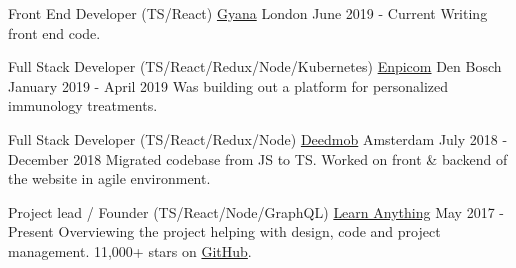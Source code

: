 
\begin{cventries}

  \cventry
    {Front End Developer (TS/React)}
    {\href{https://www.gyana.co.uk}{Gyana}}
    {London}
    {June 2019 - Current}
    {
      {Writing front end code.}
    }

  \cventry
    {Full Stack Developer (TS/React/Redux/Node/Kubernetes)}
    {\href{https://www.enpicom.com}{Enpicom}}
    {Den Bosch}
    {January 2019 - April 2019}
    {
      {Was building out a platform for personalized immunology treatments.}
    }

  \cventry
    {Full Stack Developer (TS/React/Redux/Node)}
    {\href{https://www.deedmob.com}{Deedmob}}
    {Amsterdam}
    {July 2018 - December 2018}
    {
      {Migrated codebase from JS to TS. Worked on front \& backend of the website in agile environment.}
    }

  \cventry
    {Project lead / Founder (TS/React/Node/GraphQL)}
    {\href{https://learn-anything.xyz}{Learn Anything}}
    {}
    {May 2017 - Present}
    {
      {Overviewing the project helping with design, code and project management. 11,000+ stars on \href{https://github.com/learn-anything/learn-anything}{GitHub}.}
    }

\end{cventries}
